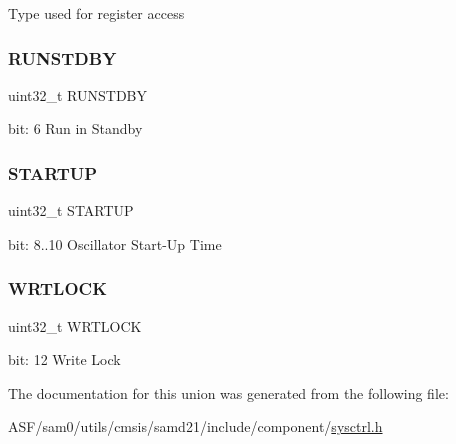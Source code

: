 Type used for register access \mbox{\label{union_s_y_s_c_t_r_l___o_s_c32_k___type_a5656560aef3eaf5aac89b68b9fe39c3a}} 
\subsubsection{\texorpdfstring{RUNSTDBY}{RUNSTDBY}}
{\footnotesize\ttfamily uint32\+\_\+t R\+U\+N\+S\+T\+D\+BY}

bit\+: 6 Run in Standby \mbox{\label{union_s_y_s_c_t_r_l___o_s_c32_k___type_a76a7a1d661ec22c2e7e8b23392d0b86a}} 
\subsubsection{\texorpdfstring{STARTUP}{STARTUP}}
{\footnotesize\ttfamily uint32\+\_\+t S\+T\+A\+R\+T\+UP}

bit\+: 8..10 Oscillator Start-\/\+Up Time \mbox{\label{union_s_y_s_c_t_r_l___o_s_c32_k___type_a0598b70de2640e0db7e13bedc2fc280b}} 
\subsubsection{\texorpdfstring{WRTLOCK}{WRTLOCK}}
{\footnotesize\ttfamily uint32\+\_\+t W\+R\+T\+L\+O\+CK}

bit\+: 12 Write Lock 

The documentation for this union was generated from the following file\+:\begin{DoxyCompactItemize}
\item 
A\+S\+F/sam0/utils/cmsis/samd21/include/component/\mbox{\hyperlink{component_2sysctrl_8h}{sysctrl.\+h}}\end{DoxyCompactItemize}
